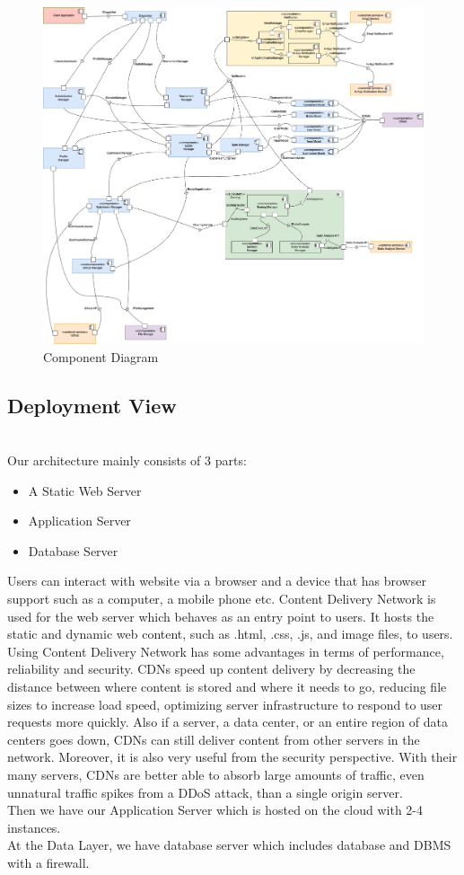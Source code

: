\begin{figure}[H]
    \centering
    \includegraphics[width=\linewidth]{Images/DD-component.drawio.png}
    \caption{Component Diagram}
\end{figure}



\newpage
\subsection{Deployment View}
\\
\indent Our architecture mainly consists of 3 parts: 
\begin{itemize}
    \item A Static Web Server
    \item Application Server
    \item Database Server
\end{itemize}
Users can interact with website via a browser and a device that has browser support such as a computer, a mobile phone etc. Content Delivery Network is used for the web server which behaves as an entry point to users. It hosts the static and dynamic web content, such as .html, .css, .js, and image files, to users. Using Content Delivery Network has some advantages in terms of performance, reliability and security. CDNs speed up content delivery by decreasing the distance between where content is stored and where it needs to go, reducing file sizes to increase load speed, optimizing server infrastructure to respond to user requests more quickly. Also  if a server, a data center, or an entire region of data centers goes down, CDNs can still deliver content from other servers in the network. Moreover, it is also very useful from the security perspective. With their many servers, CDNs are better able to absorb large amounts of traffic, even unnatural traffic spikes from a DDoS attack, than a single origin server.
\\
\indent Then we have our Application Server which is hosted on the cloud with 2-4 instances. 
\\
\indent At the Data Layer, we have database server which includes database and DBMS with a firewall. 


